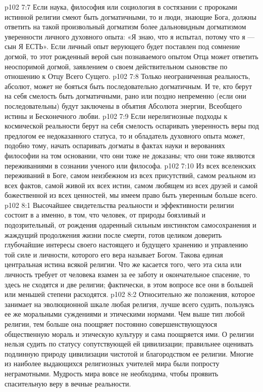 \vs p102 7:7 \pc Если наука, философия или социология в состязании с пророками истинной религии смеют быть догматичными, то и люди, знающие Бога, должны ответить на такой произвольный догматизм более дальновидным догматизмом уверенности личного духовного опыта: «Я знаю, что я испытал, потому что я --- сын Я ЕСТЬ». Если личный опыт верующего будет поставлен под сомнение догмой, то этот рожденный верой сын познаваемого опытом Отца может ответить неоспоримой догмой, заявлением о своем действительном сыновстве по отношению к Отцу Всего Сущего.
\vs p102 7:8 Только неограниченная реальность, абсолют, может не бояться быть последовательно догматичным. И те, кто берут на себя смелость быть догматичными, рано или поздно непременно (если они последовательны) будут заключены в объятия Абсолюта энергии, Всеобщего истины и Бесконечного любви.
\vs p102 7:9 Если нерелигиозные подходы к космической реальности берут на себя смелость оспаривать уверенность веры под предлогом ее недоказанного статуса, то и обладатель духовного опыта может, подобно тому, начать оспаривать догматы в фактах науки и верованиях философии на том основании, что они тоже не доказаны; что они тоже являются переживаниями в сознании ученого или философа.
\vs p102 7:10 \pc Из всех вселенских переживаний в Боге, самом неизбежном из всех присутствий, самом реальном из всех фактов, самой живой их всех истин, самом любящем из всех друзей и самой божественной из всех ценностей, мы имеем право быть уверенным больше всего.
\vs p102 8:1 Высочайшее свидетельства реальности и эффективности религии состоит в  а именно, в том, что человек, от природы боязливый и подозрительный, от рождения одаренный сильным инстинктом самосохранения и жаждущий продолжения жизни после смерти, готов целиком доверить глубочайшие интересы своего настоящего и будущего хранению и управлению той силе и личности, которого его вера называет Богом. Такова единая центральная истина всякой религии. Что же касается того, чего эта сила или личность требует от человека взамен за ее заботу и окончательное спасение, то здесь не сходятся и две религии; фактически, в этом вопросе все они в большей или меньшей степени расходятся.
\vs p102 8:2 Относительно же положения, которое занимает на эволюционной шкале любая религия, лучше всего судить, пользуясь ее же моральными суждениями и этическими нормами. Чем выше тип любой религии, тем больше она поощряет постоянно совершенствующуюся общественную мораль и этическую культуру и сама поощряется ими. О религии нельзя судить по статусу сопутствующей ей цивилизации; правильнее оценивать подлинную природу цивилизации чистотой и благородством ее религии. Многие из наиболее выдающихся религиозных учителей мира были попросту неграмотными. Мудрость мира вовсе не необходима, чтобы проявить спасительную веру в вечные реальности.
